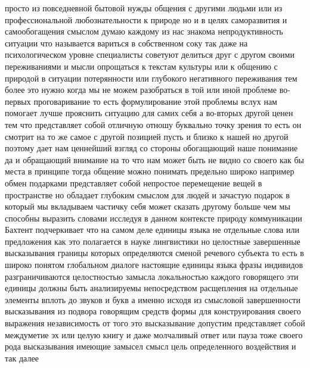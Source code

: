 просто из повседневной бытовой нужды общения с другими людьми или из
профессиональной любознательности к природе но и в целях саморазвития и
самообогащения смыслом думаю каждому из нас знакома непродуктивность ситуации
что называется вариться в собственном соку так даже на психологическом уровне
специалисты советуют делиться друг с другом своими переживаниями и мысли
опрощаться к текстам культуры или к общению с природой в ситуации потерянности
или глубокого негативного переживания тем более это нужно когда мы не можем
разобраться в той или иной проблеме во-первых проговаривание то есть
формулирование этой проблемы вслух нам помогает лучше прояснить ситуацию для
самих себя а во-вторых другой ценен тем что представляет собой отличную отношу
буквально точку зрения то есть он смотрит на то же самое с другой позицией пусть
и близко к нашей но другой поэтому дает нам ценнейший взгляд со стороны
обогащающий наше понимание да и обращающий внимание на то что нам может быть не
видно со своего как бы места в принципе тогда общение можно понимать предельно
широко например обмен подарками представляет собой непростое перемещение вещей в
пространстве но обладает глубоким смыслом для людей и зачастую подарок в который
мы вкладываем частичку себя может сказать другому больше чем мы способны
выразить словами исследуя в данном контексте природу коммуникации Бахтент
подчеркивает что на самом деле единицы языка не отдельные слова или предложения
как это полагается в науке лингвистики но целостные завершенные высказывания
границы которых определяются сменой речевого субъекта то есть в широко понятом
глобальном диалоге настоящие единицы языка фразы индивидов разграничиваются
целостностью замысла локальностью каждого говорящего эти единицы должны быть
анализируемы непосредством расщепления на отдельные элементы вплоть до звуков и
букв а именно исходя из смысловой завершенности высказывания из подвора
говорящим средств формы для конструирования своего выражения независимость от
того это высказывание допустим представляет собой междуметие эх или целую книгу
и даже молчаливый ответ или пауза тоже своего рода высказывания имеющие замысел
смысл цель определенного воздействия и так далее 


